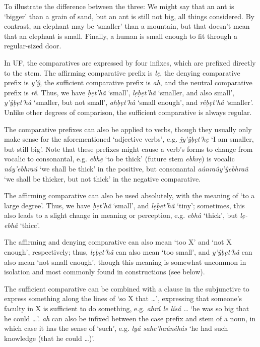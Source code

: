 \documentclass[a4paper, 12pt, twoside, final]{article}
\let \w \textit
\begin{document}
To illustrate the difference between the three: We might say that an ant is ‘bigger’ than a grain of sand, but
an ant is still not big, all things considered. By contrast, an elephant may be ‘smaller’ than a mountain,
but that doesn’t mean that an elephant is small. Finally, a human is small enough to fit through a regular-sized
door.

In UF, the comparatives are expressed by four infixes, which are prefixed directly to the stem. The affirming
comparative prefix is \w{lẹ}, the denying comparative prefix is \w{y’ŷ}, the sufficient comparative prefix is \w{ah},
and the neutral comparative prefix is \w{rê}. Thus, we have \w{ḅẹt’hâ} ‘small’, \w{lẹḅẹt’hâ} ‘smaller, and also small’,
\w{y’ŷḅẹt’hâ} ‘smaller, but not small’, \w{ahḅẹt’hâ} ‘small enough’, and \w{rêḅẹt’hâ} ‘smaller’. Unlike other degrees
of comparison, the sufficient comparative is always regular.

The comparative prefixes can also be applied to verbs, though they usually only make sense for the aforementioned
‘adjective verbs’, e.g. \w{jy’ŷḅẹt’hẹ} ‘I am smaller, but still big’. Note that these prefixes
might cause a verb’s forms to change from vocalic to consonantal, e.g. \w{ebhẹ} ‘to be thick’ (future stem \w{ebhrẹ})
is vocalic \w{náy’ebhraú} ‘we shall be thick’ in the positive, but consonantal \w{aúnraûy’ŷebhraû} ‘we shall be
thicker, but not thick’ in the negative comparative.

The affirming comparative can also be used absolutely, with the meaning of ‘to a large degree’. Thus,
we have \w{ḅẹt’hâ} ‘small’, and \w{lẹḅẹt’hâ} ‘tiny’; sometimes, this also leads to a slight change in meaning
or perception, e.g. \w{ebhâ} ‘thick’, but \w{lẹ-ebhâ} ‘thicc’.

The affirming and denying comparative can also mean ‘too X’ and ‘not X enough’, respectively; thus, \w{lẹḅẹt’hâ}
can also mean ‘too small’, and \w{y’ŷḅẹt’hâ} can also mean ‘not small enough’, though this meaning is somewhat
uncommon in isolation and most commonly found in constructions (see below).

The sufficient comparative can be combined with a clause in the subjunctive to express something along the lines
of ‘so X that \ldots’, expressing that someone’s faculty in X is sufficient to do something, e.g. \w{ahrá le lísá
\ldots} ‘he was so big that he could \ldots’. \w{ah} can also be infixed between the case prefix and stem of a
noun, in which case it has the sense of ‘such’, e.g. \w{lyá sahc’haúnéhás} ‘he had such knowledge (that he could \ldots)’.
\end{document}
